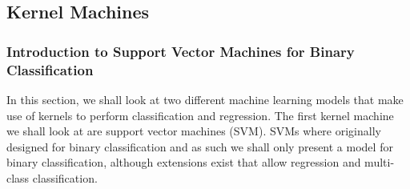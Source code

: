 \subsection{Kernel Machines}\label{Section1.4}

\subsubsection{Introduction to Support Vector Machines for Binary Classification}\label{Section1.4.1}
In this section, we shall look at two different machine learning models that make use of kernels to perform classification and regression. The first kernel machine we shall look at are support vector machines (SVM). SVMs where originally designed for binary classification and as such we shall only present a model for binary classification, although extensions exist that allow regression and multi-class classification.

